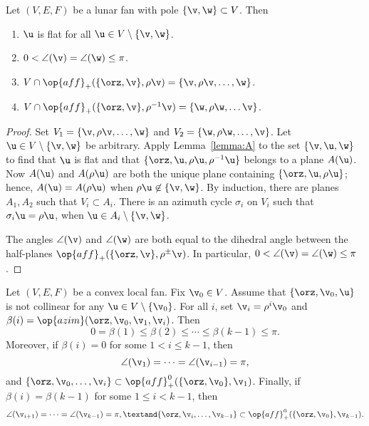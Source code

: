 \begin{lemma}\label{lemma:lunar}
Let $(V,E,F)$ be a lunar fan with pole $\{\v,\w\}\subset V$.  
Then
\begin{enumerate}\wasitemize 
\item $\u$ is flat for all $\u\in V\setminus \{\v,\w\}$. \vspace{3pt}
\item $0< \angle(\v) = \angle(\w)\le \pi$. \vspace{3pt}
\item $V\cap \op{aff}_+(\{\orz,\v\},\rho \v) = \{\v,\rho \v,\ldots,
\w\}$. \vspace{3pt}
\item $V \cap \op{aff}_+(\{\orz,\v\},\rho^{-1} \v) = \{\w,\rho
\w,\ldots \v\}$. \vspace{3pt}
\end{enumerate}\wasitemize 
\end{lemma}

\begin{proof} Set $V_1 = \{\v,\rho \v,\ldots,\w\}$ and $V_2 =
\{\w,\rho \w,\ldots,\v\}$.  Let $\u\in V\setminus\{\v,\w\}$ be
arbitrary.  Apply Lemma~\ref{lemma:A} to the set $\{\v,\u,\w\}$ to
find that $\u$ is flat and that $\{\orz,\u,\rho \u,\rho^{-1} \u\}$
belongs to a plane $A(\u)$.  Now $A(\u)$ and $A(\rho \u)$ are both
the unique plane containing $\{\orz,\u,\rho \u\}$; hence, $A(\u) =
A(\rho \u)$ when $\rho \u\not\in \{\v,\w\}$.  By induction, there
are planes $A_1, A_2$ such that $V_i\subset A_i$.  There is an
azimuth cycle $\sigma_i$ on $V_i$ such that $\sigma_i \u = \rho \u$,
when $\u \in A_i\setminus \{\v,\w\}$.

The angles $\angle(\v)$ and $\angle(\w)$ are both equal to the
dihedral angle between the half-planes
$\op{aff}_+(\{\orz,\v\},\rho^{\pm}\v)$.  In particular,
$0<\angle(\v)=\angle(\w)\le\pi$.
\end{proof}




\begin{lemma}[monotonicity] 
\label{lemma:monotone}
Let $(V,E,F)$ be a convex local fan. Fix $\v_0\in V$.  Assume that
$\{\orz,\v_0,\u\}$ is not collinear for any $\u\in
V\setminus\{\v_0\}$.  For all $i$, set $\v_i = \rho^i \v_0$ and
$\beta(i) = \op{azim}(\orz,\v_0,\v_1,\v_i)$.  Then
\[ 0=\beta(1)\le \beta(2)\le \cdots\le
\beta(k-1)\le\pi.\] 
Moreover, if $\beta(i)=0$ for some $1<i \le k-1$, then
\[ 
\angle(\v_1) = \cdots = \angle(\v_{i-1}) = \pi,
\] 
and $\{\orz,\v_0,\ldots,\v_i\} \subset \op{aff}^0_+(\{\orz,\v_0\},\v_1)$.
Finally, if $\beta(i)=\beta(k-1)$ for some $1\le i<k-1$, then 
\[ 
\angle(\v_{i+1}) = \cdots = \angle(\v_{k-1}) = \pi,
\textand  \{\orz,\v_i,\ldots,\v_{k-1}\} \subset
\op{aff}^0_+(\{\orz,\v_0\},\v_{k-1}).
\]
\end{lemma}

